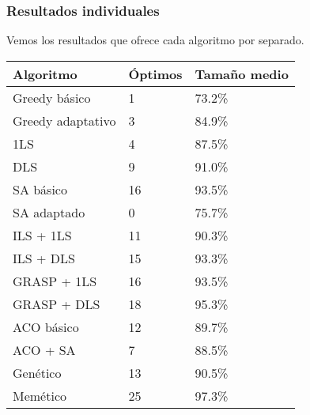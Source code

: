 \documentclass{beamer}
\theoremstyle{theorem}
\begin{document}
\begin{frame}
\frametitle{Resultados individuales}

Vemos los resultados que ofrece cada algoritmo por separado.

  \tiny
  \begin{table}
  \begin{tabular}{l l l}
    \textbf{Algoritmo} & \textbf{Óptimos} & \textbf{Tamaño medio}  \\ \hline
    Greedy básico          & 1  & 73.2\% \\ \hline
    Greedy adaptativo      & 3  & 84.9\% \\ \hline
    1LS                    & 4  & 87.5\% \\ \hline
    DLS                    & 9  & 91.0\% \\ \hline
    SA básico              & 16  & 93.5\% \\ \hline
    SA adaptado            & 0  & 75.7\% \\ \hline
    ILS + 1LS              & 11  & 90.3\% \\ \hline
    ILS + DLS              & 15  & 93.3\%  \\ \hline
    GRASP + 1LS            & 16  & 93.5\% \\ \hline
    GRASP + DLS            & 18  & 95.3\% \\ \hline
    ACO básico             & 12  & 89.7\% \\ \hline
    ACO + SA               & 7  & 88.5\% \\ \hline
    Genético               & 13  & 90.5\% \\ \hline
    Memético               & 25  & 97.3\% \\ \hline
    \end{tabular}
  \end{table}
\end{frame}
\end{document}

